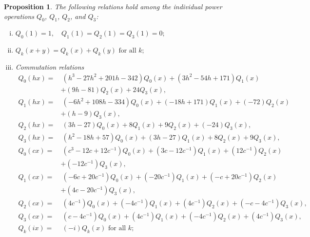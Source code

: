 \documentclass{gtpart}
\newtheorem{prop}[thm]{Proposition}
\theoremstyle{definition}
\theoremstyle{remark}
\numberwithin{equation}{section}
\numberwithin{thm}{section}
\begin{document}
\begin{prop}
\label{prop:Q}
 The following relations hold among the individual power operations 
 $Q_0$, $Q_1$, $Q_2$, and $Q_3$: 
 \begin{enumerate}[(i)]
  \item \label{Q(i)} $Q_0(1) = 1, \quad Q_1(1) = Q_2(1) = Q_3(1) = 0;$ 

  \item \label{Q(ii)} $Q_k(x+y) = Q_k(x) + Q_k(y) \text{~for all~} k;$ 

  \item \label{Q(iii)} {\em Commutation relations }
  \begin{equation*}
  \begin{split}
   Q_0(h x) = & ~ (h^3 - 27 h^2 + 201 h - 342) Q_0(x) + (3 h^2 - 54 h + 171) Q_1(x) \qquad \qquad \\
              & + (9 h - 81) Q_2(x) + 24 Q_3(x), \\
   Q_1(h x) = & ~ (-6 h^2 + 108 h - 334) Q_0(x) + (-18 h + 171) Q_1(x) + (-72) Q_2(x) \\
              & + (h - 9) Q_3(x), \\
   Q_2(h x) = & ~ (3 h - 27) Q_0(x) + 8 Q_1(x) + 9 Q_2(x) + (-24) Q_3(x), \\
   Q_3(h x) = & ~ (h^2 - 18 h + 57) Q_0(x) + (3 h - 27) Q_1(x) + 8 Q_2(x) + 9 Q_3(x), \\
   Q_0(c x) = & ~ (c^3 - 12 c + 12 c^{-1}) Q_0(x) + (3 c - 12 c^{-1}) Q_1(x) + (12 c^{-1}) Q_2(x) \\
              & + (-12 c^{-1}) Q_3(x), \\
   Q_1(c x) = & ~ (-6 c + 20 c^{-1}) Q_0(x) + (-20 c^{-1}) Q_1(x) + (- c + 20 c^{-1}) Q_2(x) \\
              & + (4 c - 20 c^{-1}) Q_3(x), \\
   Q_2(c x) = & ~ (4 c^{-1}) Q_0(x) + (-4 c^{-1}) Q_1(x) + (4 c^{-1}) Q_2(x) + (- c - 4 c^{-1}) Q_3(x), \\
   Q_3(c x) = & ~ (c - 4 c^{-1}) Q_0(x) + (4 c^{-1}) Q_1(x) + (-4 c^{-1}) Q_2(x) + (4 c^{-1}) Q_3(x), \\
   Q_k(i x) = & ~ (-i) Q_k(x) \text{~for all~} k; 
  \end{split}
  \end{equation*}


\end{enumerate}
\end{prop}
\end{document}
